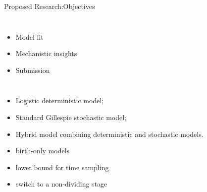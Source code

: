 \documentclass{beamer}
\begin{document}
\begin{frame}{Proposed Research:Objectives}
\begin{columns}[c]
    \begin{itemize}
    \item Model fit 
	\item Mechanistic insights
	\item Submission
	\end{itemize}
    \end{columns}
\vspace{+3em}
\begin{block}{
\begin{itemize}
\item Logistic deterministic model; 
\item Standard Gillespie stochastic model; 
\item Hybrid model combining deterministic and stochastic models.
\end{itemize}}
\begin{itemize}
\item birth-only models
\item lower bound for time sampling
\item switch to a non-dividing stage 
\end{itemize}
\end{block}
\end{frame}
\end{document}

